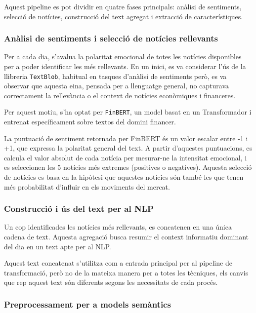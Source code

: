 \documentclass[12pt,a4paper,twoside]{book}
\begin{document}
Aquest pipeline es pot dividir en quatre fases principals: anàlisi de sentiments, selecció de notícies, construcció del text agregat i extracció de característiques.

\subsubsection{Anàlisi de sentiments i selecció de notícies rellevants}

Per a cada dia, s'avalua la polaritat emocional de totes les notícies disponibles per a poder identificar les més rellevants. En un inici, es va considerar l'ús de la llibreria \texttt{TextBlob}, habitual en tasques d'anàlisi de sentiments però, es va observar que aquesta eina, pensada per a llenguatge general, no capturava correctament la rellevància o el context de notícies econòmiques i financeres.

Per aquest motiu, s'ha optat per \texttt{FinBERT}, un model basat en un Transformador i entrenat específicament sobre textos del domini financer.

La puntuació de sentiment retornada per FinBERT és un valor escalar entre -1 i +1, que expressa la polaritat general del text. A partir d'aquestes puntuacions, es calcula el valor absolut de cada notícia per mesurar-ne la intensitat emocional, i es seleccionen les 5 notícies més extremes (positives o negatives). Aquesta selecció de notícies es basa en la hipòtesi que aquestes notícies són també les que tenen més probabilitat d'influir en els moviments del mercat.


\subsubsection{Construcció i ús del text per al NLP}

Un cop identificades les notícies més rellevants, es concatenen en una única cadena de text. Aquesta agregació busca resumir el context informatiu dominant del dia en un text apte per al NLP.

Aquest text concatenat s'utilitza com a entrada principal per al pipeline de transformació, però no de la mateixa manera per a totes les tècniques, els canvis que rep aquest text són diferents segons les necessitats de cada procés.

\subsubsection{Preprocessament per a models semàntics}
\end{document}
